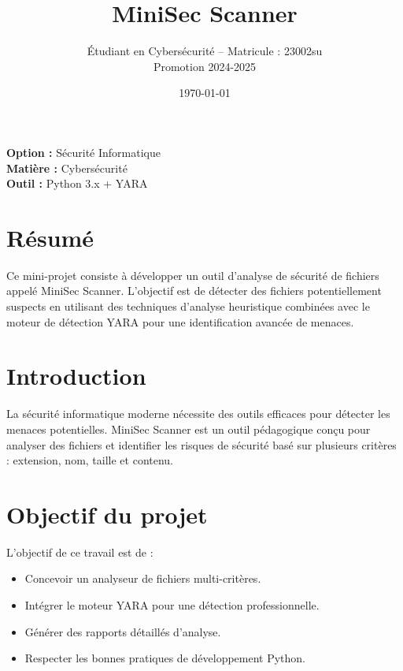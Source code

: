 \documentclass[a4paper,12pt]{article}
\title{\textbf{MiniSec Scanner}}
\author{
Étudiant en Cybersécurité -- Matricule : 23002su \\
Promotion 2024-2025
}
\date{\today}
\begin{document}
\maketitle
\vspace{1cm}

\begin{center}
\textbf{Option :} Sécurité Informatique \\
\textbf{Matière :} Cybersécurité \\
\textbf{Outil :} Python 3.x + YARA
\end{center}

\newpage

\section*{Résumé}
Ce mini-projet consiste à développer un outil d'analyse de sécurité de fichiers
appelé MiniSec Scanner. L'objectif est de détecter des fichiers potentiellement
suspects en utilisant des techniques d'analyse heuristique combinées avec le
moteur de détection YARA pour une identification avancée de menaces.

\newpage

\section{Introduction}
La sécurité informatique moderne nécessite des outils efficaces pour détecter
les menaces potentielles. MiniSec Scanner est un outil pédagogique conçu pour
analyser des fichiers et identifier les risques de sécurité basé sur plusieurs
critères : extension, nom, taille et contenu.

\section{Objectif du projet}
L'objectif de ce travail est de :
\begin{itemize}
\item Concevoir un analyseur de fichiers multi-critères.
\item Intégrer le moteur YARA pour une détection professionnelle.
\item Générer des rapports détaillés d'analyse.
\item Respecter les bonnes pratiques de développement Python.
\end{itemize}
\end{document}
